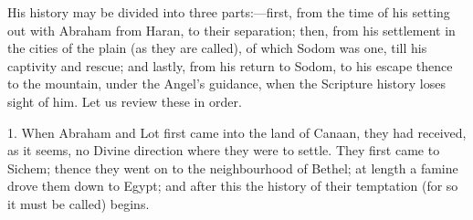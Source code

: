 His history may be divided into three parts:—first, from the time
of his setting out with Abraham from Haran, to their separation; then,
from his settlement in the cities of the plain (as they are called),
of which Sodom was one, till his captivity and rescue; and lastly,
from his return to Sodom, to his escape thence to the mountain, under
the Angel's guidance, when the Scripture history loses sight of him.
Let us review these in order.

1. When Abraham and Lot first came into the land of Canaan, they
had received, as it seems, no Divine direction where they were to
settle. They first came to Sichem; thence they went on to the
neighbourhood of Bethel; at length a famine drove them down to Egypt;
and after this the history of their temptation (for so it must be
called) begins.

